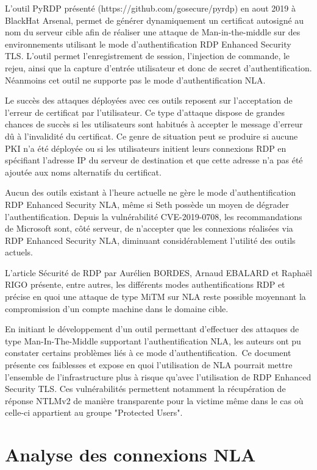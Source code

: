 L'outil PyRDP pr\'esenté (https://github.com/gosecure/pyrdp) en aout 2019 à BlackHat Arsenal, permet de générer dynamiquement un certificat autosigné au nom du serveur cible afin de réaliser une attaque de Man-in-the-middle sur des environnements utilisant le mode d'authentification RDP Enhanced Security TLS. L'outil permet l'enregistrement de session, l'injection de commande, le rejeu, ainsi que la capture d'entrée utilisateur et donc de secret d'authentification. Néanmoins cet outil ne supporte pas le mode d'authentification NLA.

Le succès des attaques d\'eployées avec ces outils reposent sur l'acceptation de l'erreur de certificat par l'utilisateur. Ce type d'attaque dispose de grandes chances de succès si les utilisateurs sont habitués à accepter le message d'erreur dû à l'invalidité du certificat. Ce genre de situation peut se produire si aucune PKI n'a été déployée ou si les utilisateurs initient leurs connexions RDP en spécifiant l'adresse IP du serveur de destination et que cette adresse n'a pas été ajoutée aux noms alternatifs du certificat.

Aucun des outils existant à l’heure actuelle ne gère le mode d’authentification RDP Enhanced Security NLA, même si Seth possède un moyen de d\'egrader l’authentification. Depuis la vulnérabilité CVE-2019-0708, les recommandations de Microsoft sont, côté serveur, de n’accepter que les connexions réalisées via RDP Enhanced Security NLA, diminuant considérablement l'utilité des outils actuels.

L'article S\'ecurité de RDP par Aurélien BORDES, Arnaud EBALARD et Raphaël RIGO présente, entre autres, les différents modes authentifications RDP et précise en quoi une attaque de type MiTM sur NLA reste possible moyennant la compromission d'un compte machine dans le domaine cible. 

En initiant le d\'eveloppement d’un outil permettant d’effectuer des attaques de type Man-In-The-Middle supportant l’authentification NLA, les auteurs ont pu constater certains problèmes liés à ce mode d’authentification. Ce document présente ces faiblesses et expose en quoi l’utilisation de NLA pourrait mettre l’ensemble de l’infrastructure plus à risque qu’avec l’utilisation de RDP Enhanced Security TLS.
Ces vuln\'erabilités permettent notamment la récupération de réponse NTLMv2 de manière transparente pour la victime même dans le cas où celle-ci appartient au groupe "Protected Users".

\section{Analyse des connexions NLA}
